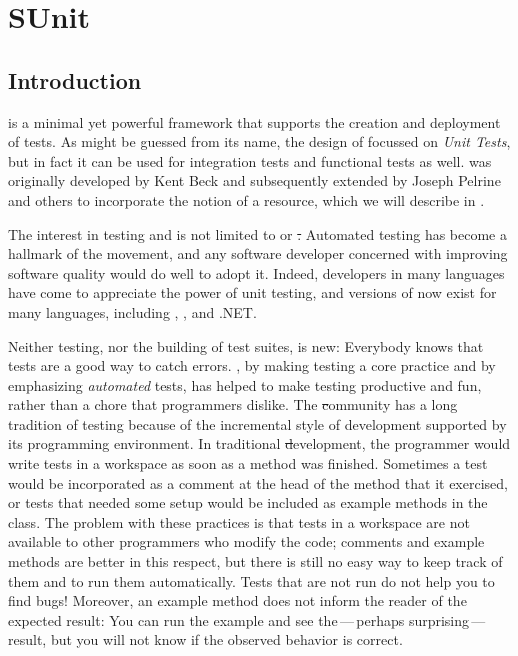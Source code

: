 \documentclass[a4paper,10pt,twoside]{book}
\begin{document}
	\renewcommand{\nnbb}[2]{} %
\fi
\chapter{SUnit}
\label{cha:SUnit}

\section{Introduction}


 is a minimal yet powerful framework that supports the creation and deployment of tests.
As might be guessed from its name, the design of \sunit focussed on \emph{Unit Tests},
but in fact it can be used for integration tests and functional tests as well.
\sunit was originally developed by Kent Beck and subsequently extended by Joseph Pelrine and others to incorporate the notion of a resource, which we will describe in .

The interest in testing and  is not limited to \squeak or \st.
Automated testing has become a hallmark of the  movement, and any software developer concerned with improving software quality would do well to adopt it.
Indeed, developers in many languages have come to appreciate the power of unit testing, and versions of \xUnit{} now exist for many languages, including , , and .NET.

Neither testing, nor the building of test suites, is new:
Everybody knows that tests are a good way to catch errors.
\mbox{,} by making testing a core practice and by emphasizing \emph{automated} tests, has helped to make testing productive and fun, rather than a chore that programmers dislike.
The \st community has a long tradition of testing because of the incremental style of development supported by its programming environment.
In traditional \st development, the programmer would write tests in a workspace as soon as a method was finished.
Sometimes a test would be incorporated as a comment at the head of the method that it exercised, or tests that needed some setup would be included as example methods in the class.
The problem with these practices is that tests in a workspace are not available to other programmers who modify the code; comments and example methods are better in this respect, but there is still no easy way to keep track of them and to run them automatically.
Tests that are not run do not help you to find bugs!
Moreover, an example method does not inform the reader of the expected result:
You can run the example and see the\,---\,perhaps surprising\,---\,result, but you will not know if the observed behavior is correct.
\end{document}
